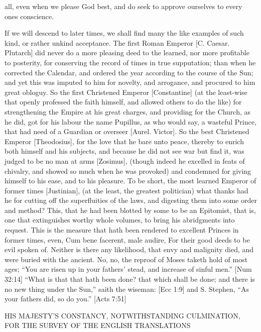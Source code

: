 {all, even when we please God best, and do seek to approve ourselves to every ones conscience.
\par }{\IP If we will descend to later times, we shall find many the like examples of such kind, or rather unkind acceptance. The first Roman Emperor [C. Caesar. Plutarch] did never do a more pleasing deed to the learned, nor more profitable to posterity, for conserving the record of times in true supputation; than when he corrected the Calendar, and ordered the year according to the course of the Sun; and yet this was imputed to him for novelty, and arrogance, and procured to him great obloguy. So the first Christened Emperor [Constantine] (at the least-wise that openly professed the faith himself, and allowed others to do the like) for strengthening the Empire at his great charges, and providing for the Church, as he did, got for his labour the name Pupillus, as who would say, a wasteful Prince, that had need of a Guardian or overseer [Aurel. Victor]. So the best Christened Emperor [Theodosius], for the love that he bare unto peace, thereby to enrich both himself and his subjects, and because he did not see war but find it, was judged to be no man at arms [Zosimus], (though indeed he excelled in feats of chivalry, and showed so much when he was provoked) and condemned for giving himself to his ease, and to his pleasure. To be short, the most learned Emperor of former times [Justinian], (at the least, the greatest politician) what thanks had he for cutting off the superfluities of the laws, and digesting them into some order and method? This, that he had been blotted by some to be an Epitomist, that is, one that extinguishes worthy whole volumes, to bring his abridgments into request. This is the measure that hath been rendered to excellent Princes in former times, even, Cum bene facerent, male audire, For their good deeds to be evil spoken of. Neither is there any likelihood, that envy and malignity died, and were buried with the ancient. No, no, the reproof of Moses taketh hold of most ages; “You are risen up in your fathers’ stead, and increase of sinful men.” [Num 32:14] “What is that that hath been done? that which shall be done; and there is no new thing under the Sun,” saith the wiseman: [Ecc 1:9] and S. Stephen, “As your fathers did, so do you.” [Acts 7:51]
\par }{\IS HIS MAJESTY’S CONSTANCY, NOTWITHSTANDING CULMINATION, FOR THE SURVEY OF THE ENGLISH TRANSLATIONS
}
